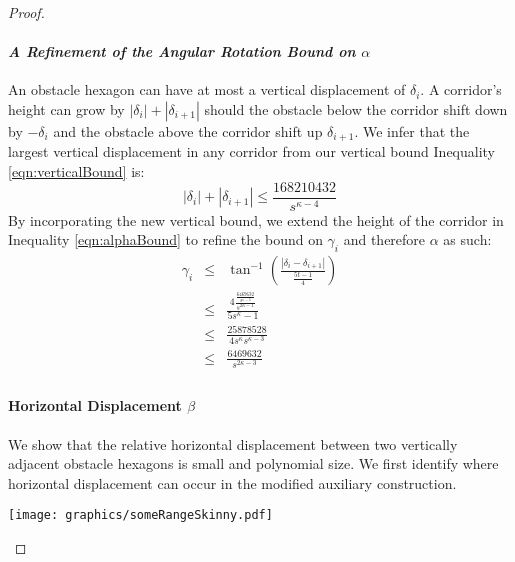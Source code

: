 \documentclass[10pt]{CSUNthesis}
\theoremstyle{plain}%
\theoremstyle{definition}
\theoremstyle{remark}
\newcommand{\lr}[1]{\left( #1 \right)}
\newcommand{\vlr}[1]{\left\vert #1 \right\vert}
\begin{document}
\begin{proof}
\paragraph{\textit{A Refinement of the Angular Rotation Bound on $\alpha$}}
An obstacle hexagon can have at most a vertical displacement of $\delta_i$.  
A corridor's height can grow by $\vlr{\delta_i} + \vlr{\delta_{i+1}}$ should the obstacle below the corridor shift down by $-\delta_i$ and the obstacle above the corridor shift up $\delta_{i+1}$.  
We infer that the largest vertical displacement in any corridor from our vertical bound Inequality \ref{eqn:verticalBound} is:
$$\vlr{\delta_i} + \vlr{\delta_{i+1}} \leq \frac{168210432}{s^{\kappa-4}}$$
By incorporating the new vertical bound, we extend the height of the corridor in Inequality \ref{eqn:alphaBound} to refine the bound on $\gamma_i$ and therefore $\alpha$ as such:
\begin{equation}\label{eqn:alphaBoundRefined}
\begin{array}{rcl}
\gamma_i & \leq & \tan^{-1} \lr{\frac{\vlr{\delta_i - \delta_{i+1}}}
									 {	\frac{5t -1}{4}	}
								}\\
&\leq& \frac{4 \frac{\frac{6469632}{s^{\kappa-3}}}{s^{2\kappa-1}}	}
			  {	5s^\kappa -1}\\
&\leq& \frac{ 25878528 }
			  {	4s^\kappa	s^{\kappa-3}} \\
&\leq& \frac{6469632}{s^{2\kappa-3}}\\
\end{array} 
\end{equation}

\paragraph{Horizontal Displacement $\beta$}

We show that the relative horizontal displacement between two vertically adjacent obstacle hexagons is small and polynomial size.
We first identify where horizontal displacement can occur in the modified auxiliary construction.  

\begin{minipage}{\linewidth}
\begin{center}
\texttt{[image: graphics/someRangeSkinny.pdf]}
\label{fig:someRangeSkinny.pdf}
\end{center}
\end{minipage}


\end{proof}
\end{document}
